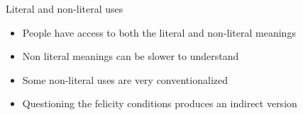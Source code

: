 \documentclass{beamer}
\begin{document}
\begin{frame}{Literal and non-literal uses}

\begin{exe}
  \ex
  \begin{xlist}
    \ex {}
    \ex {}
  \end{xlist}
  \ex 
  \begin{xlist}
    \ex {}
    \ex {}
  \end{xlist}
  \ex
  \begin{xlist}
    \ex {}
    \ex {}
  \end{xlist}
\end{exe}
\begin{itemize}
\item People have access to both the literal and non-literal meanings
\item Non literal meanings can be slower to understand
\item Some non-literal uses are very conventionalized 
  \\  \into {}
\item Questioning the felicity conditions produces an indirect version
\end{itemize}


\end{frame}
\end{document}
